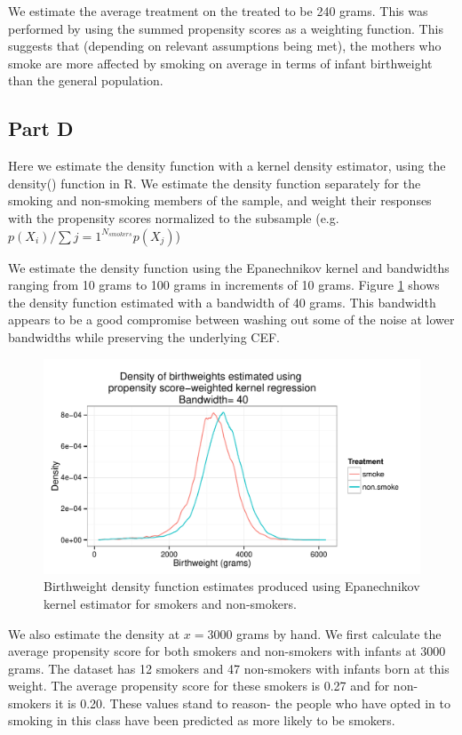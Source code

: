 \documentclass[letterpaper, 12pt]{article}
\begin{document}
We estimate the average treatment on the treated to be 240 grams. This was performed by using the summed propensity scores as a weighting function. This suggests that (depending on relevant assumptions being met), the mothers who smoke are more affected by smoking on average in terms of infant birthweight than the general population.

\subsection{Part D}
Here we estimate the density function with a kernel density estimator, using the density() function in R. We estimate the density function separately for the smoking and non-smoking members of the sample, and weight their responses with the propensity scores normalized to the subsample (e.g. $p(X_i)/\sum\limits{j=1}^{N_{smokers}}p(X_j)$)

We estimate the density function using the Epanechnikov kernel and bandwidths ranging from 10 grams to 100 grams in increments of 10 grams. Figure \ref{fig:kernel40} shows the density function estimated with a bandwidth of 40 grams. This bandwidth appears to be a good compromise between washing out some of the noise at lower bandwidths while preserving the underlying CEF. 

\begin{figure}[h!]
   \centering
   \includegraphics[width=6in]{img/kerndensity40.pdf} 
   \caption{Birthweight density function estimates produced using Epanechnikov kernel estimator for smokers and non-smokers.}
   \label{fig:kernel40}
\end{figure}

We also estimate the density at $x=3000$ grams by hand. We first calculate the average propensity score for both smokers and non-smokers with infants at 3000 grams. The dataset has 12 smokers and 47 non-smokers with infants born at this weight. The average propensity score for these smokers is 0.27 and for non-smokers it is 0.20. These values stand to reason- the people who have opted in to smoking in this class have been predicted as more likely to be smokers.
\end{document}
